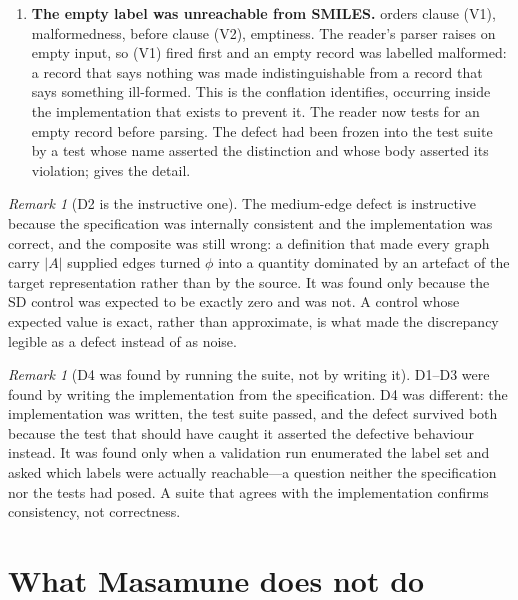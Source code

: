 \documentclass[11pt,twocolumn,a4paper]{article}
\theoremstyle{msthm}
\theoremstyle{definition}
\theoremstyle{remark}
\newtheorem{remark}[theorem]{Remark}
\newcommand{\abs}[1]{\lvert#1\rvert}
\begin{document}
\begin{enumerate}[label=\textbf{D\arabic*.},leftmargin=2.8em,itemsep=4pt]
\item \textbf{The \textsf{empty} label was unreachable from SMILES.}
 orders clause (V1), malformedness, before clause
(V2), emptiness. The reader's parser raises on empty input, so (V1)
fired first and an empty record was labelled \textsf{malformed}: a
record that says nothing was made indistinguishable from a record that
says something ill-formed. This is the conflation
 identifies, occurring inside the implementation
that exists to prevent it. The reader now tests for an empty record
before parsing. The defect had been frozen into the test suite by a test
whose name asserted the distinction and whose body asserted its
violation;  gives the detail.
\end{enumerate}

\begin{remark}[D2 is the instructive one]
\label{rem:d2}
The medium-edge defect is instructive because the specification was
internally consistent and the implementation was correct, and the
composite was still wrong: a definition that made every graph carry
$\abs{A}$ supplied edges turned $\phi$ into a quantity dominated by an
artefact of the target representation rather than by the source. It was
found only because the SD control was expected to be exactly zero and
was not. A control whose expected value is exact, rather than
approximate, is what made the discrepancy legible as a defect instead
of as noise.
\end{remark}

\begin{remark}[D4 was found by running the suite, not by writing it]
\label{rem:d4found}
D1--D3 were found by writing the implementation from the specification.
D4 was different: the implementation was written, the test suite passed,
and the defect survived both because the test that should have caught it
asserted the defective behaviour instead. It was found only when a
validation run enumerated the label set and asked which labels were
actually reachable---a question neither the specification nor the tests
had posed. A suite that agrees with the implementation confirms
consistency, not correctness.
\end{remark}



\section{What Masamune does not do}
\label{sec:limits}
\end{document}
